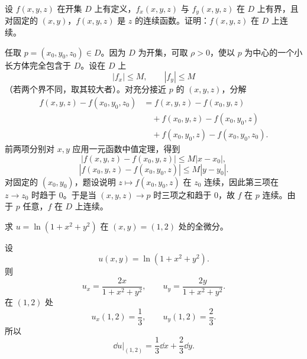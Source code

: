 \begin{xexercise}[3]
设 $f(x,y,z)$ 在开集 $D$ 上有定义，$f_x(x,y,z)$ 与 $f_y(x,y,z)$ 在 $D$ 上有界，且对固定的 $(x,y)$，$f(x,y,z)$ 是 $z$ 的连续函数。证明：$f(x,y,z)$ 在 $D$ 上连续。
\end{xexercise}
\begin{xsolution}
任取 $p=(x_0,y_0,z_0)\in D$。因为 $D$ 为开集，可取 $\rho>0$，使以 $p$ 为中心的一个小长方体完全包含于 $D$。设在 $D$ 上
\[
  |f_x|\le M,
  \qquad
  |f_y|\le M
\]
（若两个界不同，取其较大者）。对充分接近 $p$ 的 $(x,y,z)$，分解
\begin{align*}
  f(x,y,z)-f(x_0,y_0,z_0)
  &=f(x,y,z)-f(x_0,y,z)\\
  &\quad+f(x_0,y,z)-f(x_0,y_0,z)\\
  &\quad+f(x_0,y_0,z)-f(x_0,y_0,z_0).
\end{align*}
前两项分别对 $x,y$ 应用一元函数中值定理，得到
\[
  |f(x,y,z)-f(x_0,y,z)|\le M|x-x_0|,
\]
\[
  |f(x_0,y,z)-f(x_0,y_0,z)|\le M|y-y_0|.
\]
对固定的 $(x_0,y_0)$，题设说明 $z\mapsto f(x_0,y_0,z)$ 在 $z_0$ 连续，因此第三项在 $z\to z_0$ 时趋于 $0$。于是当 $(x,y,z)\to p$ 时三项之和趋于 $0$，故 $f$ 在 $p$ 连续。由于 $p$ 任意，$f$ 在 $D$ 上连续。
\end{xsolution}


\begin{xexercise}[4]
求 $u=\ln(1+x^2+y^2)$ 在 $(x,y)=(1,2)$ 处的全微分。
\end{xexercise}
\begin{xsolution}
设
\[
  u(x,y)=\ln(1+x^2+y^2).
\]
则
\[
  u_x=\frac{2x}{1+x^2+y^2},
  \qquad
  u_y=\frac{2y}{1+x^2+y^2}.
\]
在 $(1,2)$ 处
\[
  u_x(1,2)=\frac13,
  \qquad
  u_y(1,2)=\frac23.
\]
所以
\[
  \boxed{\dd u\big|_{(1,2)}=\frac13\dd x+\frac23\dd y}.
\]
\end{xsolution}


